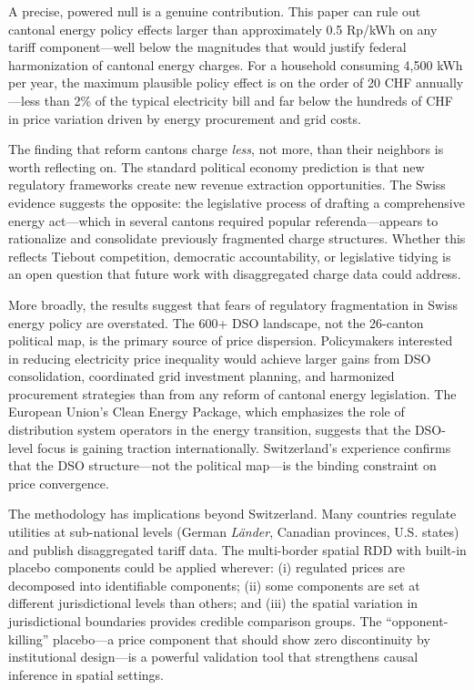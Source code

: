\documentclass[12pt]{article}
\begin{document}
A precise, powered null is a genuine contribution. This paper can rule out cantonal energy policy effects larger than approximately 0.5 Rp/kWh on any tariff component---well below the magnitudes that would justify federal harmonization of cantonal energy charges. For a household consuming 4,500 kWh per year, the maximum plausible policy effect is on the order of 20 CHF annually---less than 2\% of the typical electricity bill and far below the hundreds of CHF in price variation driven by energy procurement and grid costs.

The finding that reform cantons charge \textit{less}, not more, than their neighbors is worth reflecting on. The standard political economy prediction is that new regulatory frameworks create new revenue extraction opportunities. The Swiss evidence suggests the opposite: the legislative process of drafting a comprehensive energy act---which in several cantons required popular referenda---appears to rationalize and consolidate previously fragmented charge structures. Whether this reflects Tiebout competition, democratic accountability, or legislative tidying is an open question that future work with disaggregated charge data could address.

More broadly, the results suggest that fears of regulatory fragmentation in Swiss energy policy are overstated. The 600+ DSO landscape, not the 26-canton political map, is the primary source of price dispersion. Policymakers interested in reducing electricity price inequality would achieve larger gains from DSO consolidation, coordinated grid investment planning, and harmonized procurement strategies than from any reform of cantonal energy legislation. The European Union's Clean Energy Package, which emphasizes the role of distribution system operators in the energy transition, suggests that the DSO-level focus is gaining traction internationally. Switzerland's experience confirms that the DSO structure---not the political map---is the binding constraint on price convergence.

The methodology has implications beyond Switzerland. Many countries regulate utilities at sub-national levels (German \textit{Länder}, Canadian provinces, U.S. states) and publish disaggregated tariff data. The multi-border spatial RDD with built-in placebo components could be applied wherever: (i) regulated prices are decomposed into identifiable components; (ii) some components are set at different jurisdictional levels than others; and (iii) the spatial variation in jurisdictional boundaries provides credible comparison groups. The ``opponent-killing'' placebo---a price component that should show zero discontinuity by institutional design---is a powerful validation tool that strengthens causal inference in spatial settings.
\end{document}
